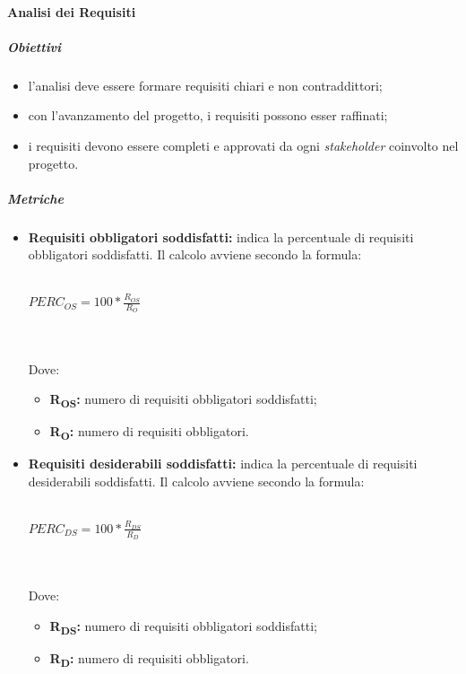 \paragraph{Analisi dei Requisiti}
\subparagraph{Obiettivi}
\begin{itemize}
	\item l'analisi deve essere formare requisiti chiari e non contraddittori;
	\item con l'avanzamento del progetto, i requisiti possono esser raffinati;
	\item i requisiti devono essere completi e approvati da ogni \textit{stakeholder\glos} coinvolto nel progetto.
\end{itemize}
\subparagraph{Metriche}
\begin{itemize}
	\item \textbf{Requisiti obbligatori soddisfatti:} indica la percentuale di requisiti obbligatori soddisfatti. Il calcolo avviene secondo la formula:\\\\
	\centerline{
		\begin{math}
		PERC_{OS}=100*\frac{R_{OS}}{R_O}
		\end{math}
	}
	\\\\Dove:
	\begin{itemize}
		\item \textbf{R\textsubscript{OS}:} numero di requisiti obbligatori soddisfatti;
		\item \textbf{R\textsubscript{O}:} numero di requisiti obbligatori.
	\end{itemize}
	\item \textbf{Requisiti desiderabili soddisfatti:} indica la percentuale di requisiti desiderabili soddisfatti. Il calcolo avviene secondo la formula:\\\\
		\centerline{
		\begin{math}
		PERC_{DS}=100*\frac{R_{DS}}{R_D}
		\end{math}
	}
	\\\\Dove:
	\begin{itemize}
		\item \textbf{R\textsubscript{DS}:} numero di requisiti obbligatori soddisfatti;
		\item \textbf{R\textsubscript{D}:} numero di requisiti obbligatori.
	\end{itemize}
\end{itemize}

